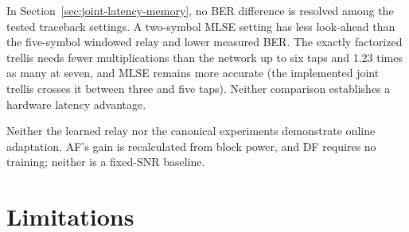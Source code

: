 In Section~\ref{sec:joint-latency-memory}, no BER difference is resolved among the tested traceback settings. A two-symbol MLSE setting has less look-ahead than the five-symbol windowed relay and lower measured BER. The exactly factorized trellis needs fewer multiplications than the network up to six taps and 1.23 times as many at seven, and MLSE remains more accurate (the implemented joint trellis crosses it between three and five taps). Neither comparison establishes a hardware latency advantage.

Neither the learned relay nor the canonical experiments demonstrate online adaptation. AF's gain is recalculated from block power, and DF requires no training; neither is a fixed-SNR baseline.

\section{Limitations}\label{sec:limitations}

